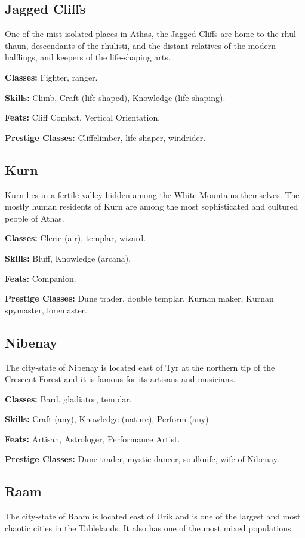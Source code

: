 \subsection{Jagged Cliffs}
One of the mist isolated places in Athas, the Jagged Cliffs are home to the rhul‐thaun, descendants of the rhulisti, and the distant relatives of the modern halflings, and keepers of the life‐shaping arts.

\textbf{Classes:} Fighter, ranger.

\textbf{Skills:} Climb, Craft (life‐shaped), Knowledge (life‐shaping).

\textbf{Feats:} Cliff Combat, Vertical Orientation.

\textbf{Prestige Classes:} Cliffclimber, life‐shaper, windrider.


\subsection{Kurn}
Kurn lies in a fertile valley hidden among the White Mountains themselves. The mostly human residents of Kurn are among the most sophisticated and cultured people of Athas.

\textbf{Classes:} Cleric (air), templar, wizard.

\textbf{Skills:} Bluff, Knowledge (arcana).

\textbf{Feats:} Companion.

\textbf{Prestige Classes:} Dune trader, double templar, Kurnan maker, Kurnan spymaster, loremaster.

\subsection{Nibenay}
The city‐state of Nibenay is located east of Tyr at the northern tip of the Crescent Forest and it is famous for its artisans and musicians.

\textbf{Classes:} Bard, gladiator, templar.

\textbf{Skills:} Craft (any), Knowledge (nature), Perform (any).

\textbf{Feats:} Artisan, Astrologer, Performance Artist.

\textbf{Prestige Classes:} Dune trader, mystic dancer, soulknife, wife of Nibenay.

\subsection{Raam}
The city‐state of Raam is located east of Urik and is one of the largest and most chaotic cities in the Tablelands. It also has one of the most mixed populations.

